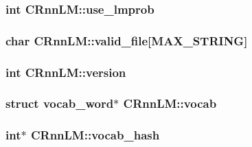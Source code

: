 \subsubsection[{use\+\_\+lmprob}]{\setlength{\rightskip}{0pt plus 5cm}int C\+Rnn\+L\+M\+::use\+\_\+lmprob}\hypertarget{class_c_rnn_l_m_aeed9babe07c41579d599c30b31de7701}{}\label{class_c_rnn_l_m_aeed9babe07c41579d599c30b31de7701}
\subsubsection[{valid\+\_\+file}]{\setlength{\rightskip}{0pt plus 5cm}char C\+Rnn\+L\+M\+::valid\+\_\+file\mbox{[}{\bf M\+A\+X\+\_\+\+S\+T\+R\+I\+NG}\mbox{]}}\hypertarget{class_c_rnn_l_m_a306dd565a7cd3a7e78227c408ffa394b}{}\label{class_c_rnn_l_m_a306dd565a7cd3a7e78227c408ffa394b}
\subsubsection[{version}]{\setlength{\rightskip}{0pt plus 5cm}int C\+Rnn\+L\+M\+::version}\hypertarget{class_c_rnn_l_m_a2b94ddb7cd2afeeb122be9dc9f20b036}{}\label{class_c_rnn_l_m_a2b94ddb7cd2afeeb122be9dc9f20b036}
\subsubsection[{vocab}]{\setlength{\rightskip}{0pt plus 5cm}struct {\bf vocab\+\_\+word}$\ast$ C\+Rnn\+L\+M\+::vocab}\hypertarget{class_c_rnn_l_m_a4492ee3ac9bb0d0cb8337d4e7dea3ee9}{}\label{class_c_rnn_l_m_a4492ee3ac9bb0d0cb8337d4e7dea3ee9}
\subsubsection[{vocab\+\_\+hash}]{\setlength{\rightskip}{0pt plus 5cm}int$\ast$ C\+Rnn\+L\+M\+::vocab\+\_\+hash}\hypertarget{class_c_rnn_l_m_a40dcad20bacbe080c4a1812291894396}{}\label{class_c_rnn_l_m_a40dcad20bacbe080c4a1812291894396}
